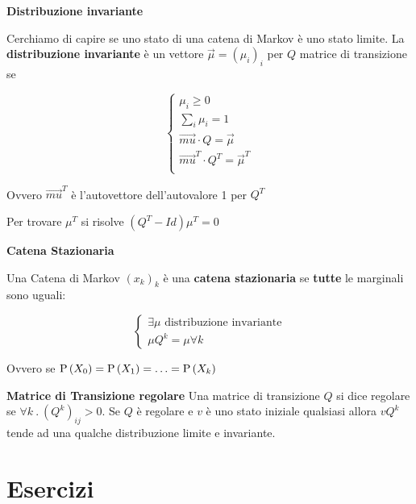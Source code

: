\begin{defn}
	\textbf{Distribuzione invariante}
	
	Cerchiamo di capire se uno stato di una catena di Markov è uno stato limite. La \textbf{distribuzione invariante} è un vettore $ \vec{\mu} = (\mu_i)_i $ per $ Q $ matrice di transizione se 
	
	\begin{equation*}
	\begin{cases}
	\mu_i \geq 0 \\
	\sum_i \mu_i = 1 \\
	\vec{mu} \cdot Q = \vec{\mu} \\
	\vec{mu}^T \cdot Q^T = \vec{\mu}^T \\
	\end{cases}
	\end{equation*}
	
	Ovvero $ \vec{mu}^T $ è l'autovettore dell'autovalore 1 per $ Q^T $
	
	Per trovare $ \mu^T $ si risolve $(Q^T-Id)\mu^T = 0$
\end{defn}

\begin{defn}
	\textbf{Catena Stazionaria}
	
	Una Catena di Markov $ (x_k)_k $ è una \textbf{catena stazionaria} se \textbf{tutte} le marginali sono uguali:
	
	\[ \begin{cases}
	\exists \mu \text{ distribuzione invariante} \\
	\mu Q^k = \mu \forall k 
	\end{cases} \]
	
	Ovvero se $ \text{P}\left(X_0\right) = \text{P}\left(X_1\right) = \hdots = \text{P}\left(X_k\right) $
\end{defn}

\begin{defn}
	\textbf{Matrice di Transizione regolare}
	Una matrice di transizione $ Q $ si dice regolare se $ \forall k \>.\> (Q^k)_{ij} > 0 $. Se $ Q $ è regolare e $ v $ è uno stato iniziale qualsiasi allora $ vQ^k $ tende ad una qualche distribuzione limite e invariante.
\end{defn}


\section{Esercizi}

